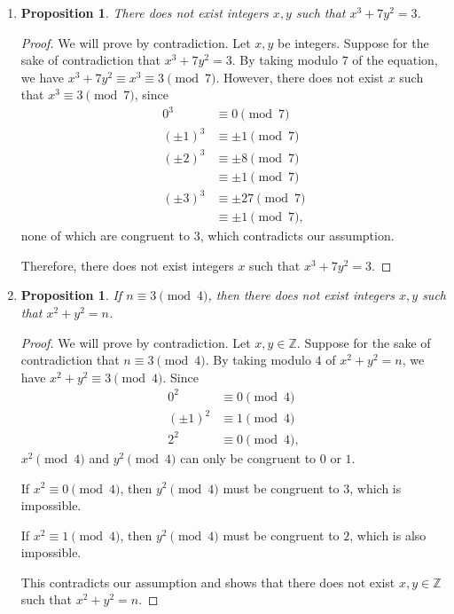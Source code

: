 \documentclass{article}
\newtheorem{prop}[thm]{Proposition}
\begin{document}
\begin{enumerate}
\begin{proof}
    Therefore, the possible congruence classes are $[1], [-2]$.
\end{proof}

\item 
\begin{prop}
    There does not exist integers $x, y$ such that $x^3 + 7y^2 = 3$.
\end{prop}
\begin{proof}
    We will prove by contradiction. Let $x, y$ be integers. Suppose for the sake of contradiction that $x^3 + 7y^2 = 3$. By taking modulo $7$ of the equation, we have $x^3 + 7y^2 \equiv x^3 \equiv 3 \pmod{7}$. However, there does not exist $x$ such that $x^3 \equiv 3 \pmod{7}$, since 
    \begin{align}
              0^3 &\equiv 0 \pmod{7} \\
        (\pm 1)^3 &\equiv \pm 1 \pmod{7} \\
        (\pm 2)^3 &\equiv \pm 8 \pmod{7} \\
                  &\equiv \pm 1 \pmod{7} \\
        (\pm 3)^3 &\equiv \pm 27 \pmod{7} \\
                  &\equiv \pm 1 \pmod{7},
    \end{align}
    none of which are congruent to $3$, which contradicts our assumption.

    Therefore, there does not exist integers $x$ such that $x^3 + 7y^2 = 3$.
\end{proof}

\item 
\begin{prop}
    If $n \equiv 3 \pmod{4}$, then there does not exist integers  $x, y$ such that $x^2 + y^2 = n$.
\end{prop}
\begin{proof}
    We will prove by contradiction. Let $x, y \in \mathbb{Z}$. Suppose for the sake of contradiction that $n \equiv 3 \pmod{4}$. By taking modulo $4$ of $x^2 + y^2 = n$, we have $x^2 + y^2 \equiv 3 \pmod{4}$. Since 
    \begin{align}
              0^2 &\equiv 0 \pmod{4} \\
        (\pm 1)^2 &\equiv 1 \pmod{4} \\
              2^2 &\equiv 0 \pmod{4},
    \end{align}
    $x^2 \pmod{4}$ and $y^2 \pmod{4}$ can only be congruent to $0$ or $1$. 

    If $x^2 \equiv 0 \pmod{4}$, then $y^2 \pmod{4}$ must be congruent to $3$, which is impossible.

    If $x^2 \equiv 1 \pmod{4}$, then $y^2 \pmod{4}$ must be congruent to $2$, which is also impossible.

    This contradicts our assumption and shows that there does not exist $x, y \in \mathbb{Z}$ such that $x^2 + y^2 = n$.
\end{proof}
    
\end{enumerate}
\end{document}
